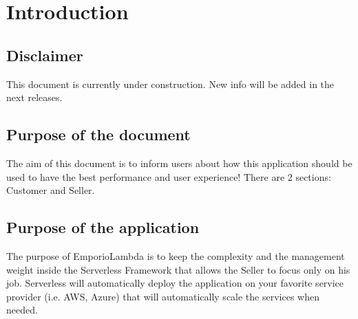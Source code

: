 \section{Introduction} \label{_introduction}
\subsection{Disclaimer}
This document is currently under construction. New info will be added in the next releases.

\subsection{Purpose of the document}
The aim of this document is to inform users about how this application should be used to have the best performance and user experience! There are 2 sections: Customer and Seller.

\subsection{Purpose of the application}
The purpose of EmporioLambda is to keep the complexity and the management weight inside the Serverless Framework that allows the Seller to focus only on his job. Serverless will automatically deploy the application on your favorite service provider (i.e. AWS, Azure) that will automatically scale the services when needed.